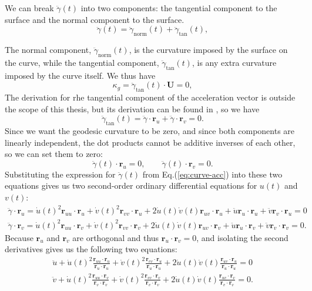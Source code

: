 \documentclass[12pt]{article}
\begin{document}
We can break $\ddot{\gamma}(t)$ into two components: the tangential component to the surface and the normal component to the surface.
\begin{equation}\label{eq:curve-acc-decomp}
	\ddot{\gamma}(t) = \ddot{\gamma}_{\text{norm}}(t) + \ddot{\gamma}_{\text{tan}}(t),
\end{equation}

The normal component, $\ddot{\gamma}_{\text{norm}}(t)$, is the curvature imposed by the surface on the curve, while the tangential component, $\ddot{\gamma}_{\text{tan}}(t)$, is any extra curvature imposed by the curve itself.
We thus have
\[
	\kappa_{g} = \ddot{\gamma}_{\text{tan}}(t) \cdot \mathbf{U} = 0,
\]
The derivation for rhe tangential component of the acceleration vector is outside the scope of this thesis, but its derivation can be found in \cite{celano2022why}\cite{oprea2007differential}, so we have 
\[
	\ddot{\gamma}_{\text{tan}}(t) = \ddot{\gamma} \cdot \mathbf{r}_{u} + \ddot{\gamma} \cdot \mathbf{r}_{v} = 0.
\]
Since we want the geodesic curvature to be zero, and since both components are linearly independent, the dot products cannot be additive inverses of each other, so we can set them to zero:
\[
	\ddot{\gamma}(t) \cdot \mathbf{r}_{u} = 0, \qquad \ddot{\gamma}(t) \cdot \mathbf{r}_{v} = 0.
\]	
Substituting the expression for $\ddot{\gamma}(t)$ from Eq.(\ref{eq:curve-acc}) into these two equations gives us two second-order ordinary differential equations for $u(t)$ and $v(t)$:
\begin{align*}
	\ddot{\gamma} \cdot \mathbf{r}_{u} = \dot{u}(t)^{2}\mathbf{r}_{uu} \cdot \mathbf{r}_{u} + \dot{v}(t)^{2}\mathbf{r}_{vv} \cdot \mathbf{r}_{u} + 2\dot{u}(t)\dot{v}(t)\mathbf{r}_{uv} \cdot \mathbf{r}_{u} + \ddot{u}\mathbf{r}_{u} \cdot \mathbf{r}_{u} + \ddot{v}\mathbf{r}_{v} \cdot \mathbf{r}_{u} = 0 \\
	\ddot{\gamma} \cdot \mathbf{r}_{v} = \dot{u}(t)^{2}\mathbf{r}_{uu} \cdot \mathbf{r}_{v} + \dot{v}(t)^{2}\mathbf{r}_{vv} \cdot \mathbf{r}_{v} + 2\dot{u}(t)\dot{v}(t)\mathbf{r}_{uv} \cdot \mathbf{r}_{v} + \ddot{u}\mathbf{r}_{u} \cdot \mathbf{r}_{v} + \ddot{v}\mathbf{r}_{v} \cdot \mathbf{r}_{v} = 0. 
\end{align*}
Because $\mathbf{r}_{u}$ and $\mathbf{r}_{v}$ are orthogonal and thus $\mathbf{r}_{u}\cdot\mathbf{r}_{v} = 0$, and isolating the second derivatives gives us the following two equations:
\begin{align}
	\ddot{u} + \dot{u}(t)^{2}\frac{\mathbf{r}_{uu} \cdot \mathbf{r}_{u}}{\mathbf{r}_{u} \cdot \mathbf{r}_{u}} + \dot{v}(t)^{2}\frac{\mathbf{r}_{vv} \cdot \mathbf{r}_{u}}{\mathbf{r}_{u} \cdot \mathbf{r}_{u}} + 2\dot{u}(t)\dot{v}(t)\frac{\mathbf{r}_{uv} \cdot \mathbf{r}_{u}}{\mathbf{r}_{u} \cdot \mathbf{r}_{u}} = 0 \label{eq:geodesic-acc-decomp-1}\\
	\ddot{v} + \dot{u}(t)^{2}\frac{\mathbf{r}_{uu} \cdot \mathbf{r}_{v}}{\mathbf{r}_{v} \cdot \mathbf{r}_{v}} + \dot{v}(t)^{2}\frac{\mathbf{r}_{vv} \cdot \mathbf{r}_{v}}{\mathbf{r}_{v} \cdot \mathbf{r}_{v}} + 2\dot{u}(t)\dot{v}(t)\frac{\mathbf{r}_{uv} \cdot \mathbf{r}_{v}}{\mathbf{r}_{v} \cdot \mathbf{r}_{v}} = 0. \label{eq:geodesic-acc-decomp-2}
\end{align}
\end{document}
